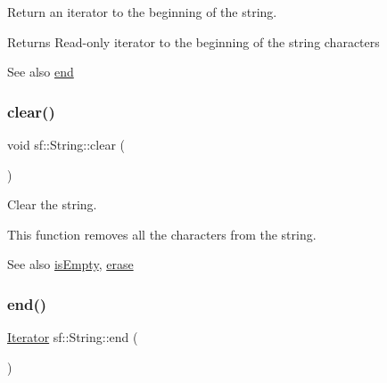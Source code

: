 Return an iterator to the beginning of the string. 

\begin{DoxyReturn}{Returns}
Read-\/only iterator to the beginning of the string characters
\end{DoxyReturn}
\begin{DoxySeeAlso}{See also}
\mbox{\hyperlink{classsf_1_1_string_ac823012f39cb6f61100418876e99d53b}{end}} \begin{DoxyVerb}\end{DoxyVerb}
 
\end{DoxySeeAlso}
\mbox{\label{classsf_1_1_string_a391c1b4950cbf3d3f8040cea73af2969}} 
\subsubsection{\texorpdfstring{clear()}{clear()}}
{\footnotesize\ttfamily void sf\+::\+String\+::clear (\begin{DoxyParamCaption}{ }\end{DoxyParamCaption})}



Clear the string. 

This function removes all the characters from the string.

\begin{DoxySeeAlso}{See also}
\mbox{\hyperlink{classsf_1_1_string_a2ba26cb6945d2bbb210b822f222aa7f6}{is\+Empty}}, \mbox{\hyperlink{classsf_1_1_string_aaa78a0a46b3fbe200a4ccdedc326eb93}{erase}} \begin{DoxyVerb}\end{DoxyVerb}
 
\end{DoxySeeAlso}
\mbox{\label{classsf_1_1_string_ac823012f39cb6f61100418876e99d53b}} 
\subsubsection{\texorpdfstring{end()}{end()}\hspace{0.1cm}{\footnotesize\ttfamily [1/2]}}
{\footnotesize\ttfamily \mbox{\hyperlink{classsf_1_1_string_ac90f2b7b28f703020f8d027e98806235}{Iterator}} sf\+::\+String\+::end (\begin{DoxyParamCaption}{ }\end{DoxyParamCaption})}



